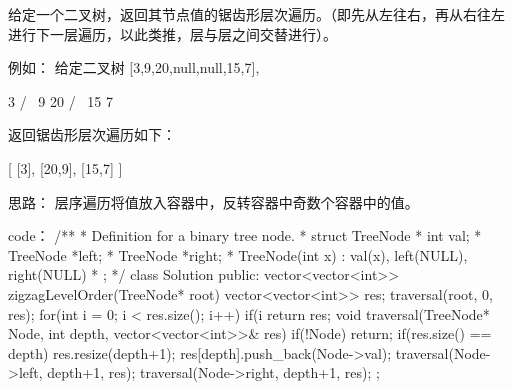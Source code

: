 给定一个二叉树，返回其节点值的锯齿形层次遍历。（即先从左往右，再从右往左进行下一层遍历，以此类推，层与层之间交替进行）。

例如：
给定二叉树 [3,9,20,null,null,15,7],

    3
   / \
  9  20
    /  \
   15   7

返回锯齿形层次遍历如下：

[
  [3],
  [20,9],
  [15,7]
]






















思路：
层序遍历将值放入容器中，反转容器中奇数个容器中的值。






















code：
/**
 * Definition for a binary tree node.
 * struct TreeNode {
 *     int val;
 *     TreeNode *left;
 *     TreeNode *right;
 *     TreeNode(int x) : val(x), left(NULL), right(NULL) {}
 * };
 */
class Solution {
public:
    vector<vector<int>> zigzagLevelOrder(TreeNode* root) {
        vector<vector<int>> res;
        traversal(root, 0, res);
        for(int i = 0; i < res.size(); i++)
        {
            if(i %
        }
        return res;
    }
    void traversal(TreeNode* Node, int depth, vector<vector<int>>& res)
    {
        if(!Node) return;
        if(res.size() == depth)
            res.resize(depth+1);
        res[depth].push_back(Node->val);
        traversal(Node->left, depth+1, res);
        traversal(Node->right, depth+1, res);
    }
};